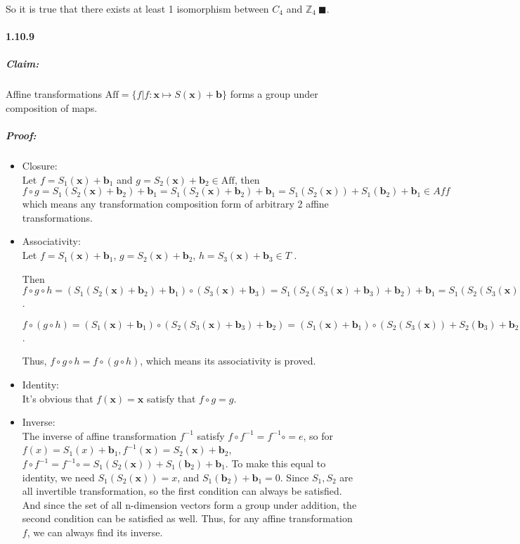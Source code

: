 \documentclass[11pt]{article}
\begin{document}
		So it is true that there exists at least 1 isomorphism between $C_4$ and $\mathbb{Z}_4 \ \blacksquare$.
	\paragraph{1.10.9}
		\subparagraph{Claim:} Affine transformations $\mathrm{Aff} = \{f | f:\textbf{x}\mapsto S(\textbf{x}) + \textbf{b}\}$ forms a group under composition of maps.
		\subparagraph{Proof:} 
			\begin{itemize} 
				\item Closure:\\ Let $f = S_1(\textbf{x}) + \textbf{b}_1$ and $g = S_2(\textbf{x}) + \textbf{b}_2 \in \mathrm{Aff}$, then $f \circ g = S_1(S_2(\textbf{x}) + \textbf{b}_2) + \textbf{b}_1 = S_1(S_2(\textbf{x}) + \textbf{b}_2) + \textbf{b}_1 = S_1(S_2(\textbf{x})) + S_1(\textbf{b}_2) + \textbf{b}_1\in Aff$ which means any transformation composition form of arbitrary 2 affine transformations.
				\item Associativity:\\Let $f = S_1(\textbf{x}) + \textbf{b}_1$, $g = S_2(\textbf{x}) + \textbf{b}_2$,	$h = S_3(\textbf{x}) + \textbf{b}_3 \in T$	.
				 
					Then $f \circ g \circ h = (S_1(S_2(\textbf{x}) + \textbf{b}_2) + \textbf{b}_1) \circ (S_3(\textbf{x}) + \textbf{b}_3) = S_1(S_2(S_3(\textbf{x}) + \textbf{b}_3) + \textbf{b}_2) + \textbf{b}_1 = S_1(S_2(S_3(\textbf{x}))) + S_1(S_2(\textbf{b}_3)) + S_1(\textbf{b}_2) + \textbf{b}_1$.
					
					$f \circ (g \circ h) = (S_1(\textbf{x}) + \textbf{b}_1) \circ (S_2(S_3(\textbf{x}) + \textbf{b}_3) + \textbf{b}_2) = (S_1(\textbf{x}) + \textbf{b}_1) \circ (S_2(S_3(\textbf{x})) + S_2(\textbf{b}_3) + \textbf{b}_2) = S_1(S_2(S_3(\textbf{x}))) + S_1(S_2(\textbf{b}_3)) + S_1(\textbf{b}_2) + \textbf{b}_1$.
					
					Thus, $f \circ g \circ h = f \circ (g \circ h)$, which means its associativity is proved.
				\item Identity:\\It's obvious that $f(\textbf{x}) = \textbf{x}$ satisfy that $f \circ g = g$.
				\item Inverse:\\ The inverse of affine transformation $f^{-1}$ satisfy $f \circ f^{-1} = f^{-1} \circ = e$, so for $f(x) = S_1(x) + \textbf{b}_1, f^{-1}(\textbf{x}) = S_2(\textbf{x}) + \textbf{b}_2$, $f \circ f^{-1} = f^{-1} \circ = S_1(S_2(\textbf{x})) + S_1(\textbf{b}_2) + \textbf{b}_1$. To make this equal to identity, we need $S_1(S_2(\textbf{x})) = x$, and $S_1(\textbf{b}_2) + \textbf{b}_1 = 0$. Since $S_1, S_2$ are all invertible transformation, so the first condition can always be satisfied. And since the set of all n-dimension vectors form a group under addition, the second condition can be satisfied as well. Thus, for any affine transformation $f$, we can always find its inverse.
			\end{itemize}
			
\end{document}
